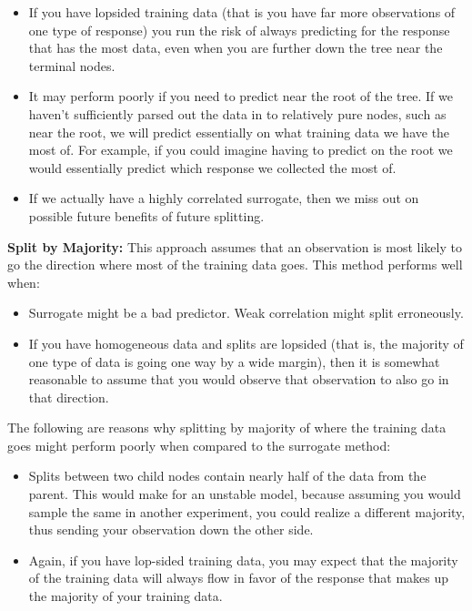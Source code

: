 \documentclass[11pt]{article}
\begin{document}
\begin{itemize}
\item If you have lopsided training data (that is you have far more 
observations of one type of response) you run the risk of always 
predicting for the response that has the most data, even when you are further 
down the tree near the terminal nodes.
\item It may perform poorly if you need to predict near the root of the tree. 
If we haven't sufficiently parsed out the data in to relatively pure nodes, 
such as near the root, we will predict essentially on what training data we 
have the most of. For example, if you could imagine having to predict on the 
root we would essentially predict which response we collected the most of.
\item If we actually have a highly correlated surrogate, then we miss out on 
possible future benefits of future splitting.
\end{itemize}

\vspace{2 mm}
\noindent
{\bf Split by Majority:} This approach assumes that an observation is most 
likely to go the direction where most of the training data goes. This method 
performs well when:

\begin{itemize}
\item Surrogate might be a bad predictor. Weak correlation might split 
erroneously.
\item If you have homogeneous data and splits are lopsided (that is, the 
majority of one type of data is going one way by a wide margin), then it is 
somewhat reasonable to assume that you would observe that observation to also 
go in that direction.
\end{itemize}

\vspace{2 mm}
\noindent
The following are reasons why splitting by majority of where the training data 
goes might perform poorly when compared to the surrogate method:

\begin{itemize}
\item Splits between two child nodes contain nearly half of the data from the 
parent. This would make for an unstable model, because assuming you would 
sample the same in another experiment, you could realize a different majority, 
thus sending your observation down the other side.
\item Again, if you have lop-sided training data, you may expect that the 
majority of the training data will always flow in favor of the response that 
makes up the majority of your training data.
\end{itemize}
\end{document}
